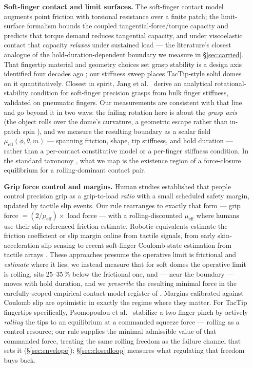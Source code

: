 \documentclass[journal]{IEEEtran}
\newcommand{\mueff}{\mu_{\mathrm{eff}}}
\begin{document}
\textbf{Soft-finger contact and limit surfaces.} The soft-finger contact
model augments point friction with torsional resistance over a finite
patch; the limit-surface formalism
\cite{goyal1991planar,kao1992quasistatic,xydas1999modeling} bounds the
coupled tangential-force/torque capacity and predicts that torque demand
reduces tangential capacity, and under viscoelastic contact that capacity
\emph{relaxes} under sustained load \cite{tiezzi2007modeling} --- the
literature's closest analogue of the hold-duration-dependent boundary we
measure in \S\ref{sec:carried}. That fingertip material and geometry
choices set grasp stability is a design axis identified four decades ago
\cite{cutkosky1986friction}; our stiffness sweep places TacTip-style solid
domes on it quantitatively. Closest in spirit, Jang et al.\
\cite{jang2024rotational} derive an analytical rotational-stability
condition for soft-finger precision grasps from bulk finger stiffness,
validated on pneumatic fingers. Our measurements are consistent with that
line and go beyond it in two ways: the failing rotation here is about
the \emph{grasp axis} (the object rolls over the dome's curvature, a
geometric escape rather than in-patch spin \cite{montana1988kinematics}),
and we measure the resulting boundary as a scalar field
$\mueff(\phi,\theta,m)$ --- spanning friction, shape, tip stiffness, and
hold duration --- rather than a per-contact constitutive model or a
per-finger stiffness condition. In the standard taxonomy
\cite{bicchi2000robotic}, what we map is the existence region of a
force-closure equilibrium for a rolling-dominant contact pair.

\textbf{Grip force control and margins.} Human studies
\cite{johansson1984roles,johansson2009coding} established that people
control precision grip as a grip-to-load \emph{ratio} with a small
scheduled safety margin, updated by tactile slip events. Our rule
rearranges to exactly that form --- grip force $= (2/\mueff) \times$ load
force --- with a rolling-discounted $\mueff$ where humans use their
slip-referenced friction estimate. Robotic equivalents estimate the
friction coefficient or slip margin online from tactile signals, from early
skin-acceleration slip sensing \cite{howe1989sensing} to recent soft-finger
Coulomb-state estimation from tactile arrays \cite{jang2024soft}. These
approaches presume the operative limit is frictional and \emph{estimate}
where it lies; we instead measure that for soft domes the operative limit
is rolling, sits 25--35\,\% below the frictional one, and --- near the
boundary --- moves with hold duration, and we \emph{prescribe} the
resulting minimal force in the carefully-scoped empirical-contact-model
register of \cite{howe1996practical}. Margins calibrated against Coulomb
slip are optimistic in exactly the regime where they matter. For TacTip
fingertips specifically, Psomopoulou et al.\ \cite{psomopoulou2021pinching}
stabilize a two-finger pinch by actively \emph{rolling} the tips to an
equilibrium at a commanded squeeze force --- rolling as a control
resource; our rule supplies the minimal admissible value of that
commanded force, treating the same rolling freedom as the failure channel
that sets it (\S\ref{sec:envelope}); \S\ref{sec:closedloop} measures what
regulating that freedom buys back.
\end{document}
